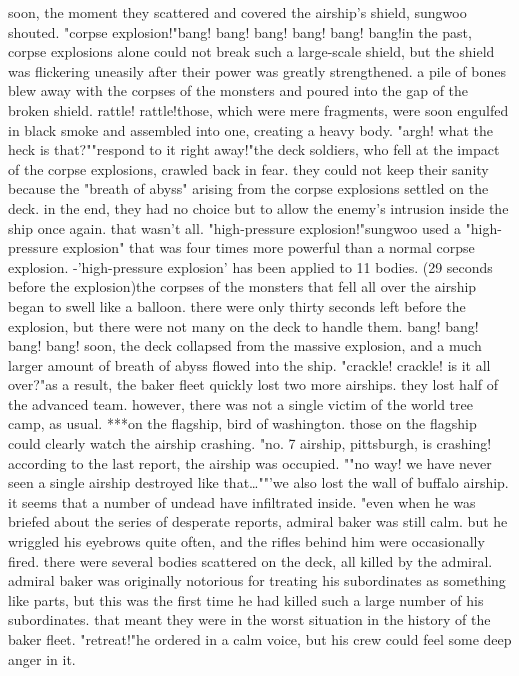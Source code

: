 soon, the moment they scattered and covered the airship's shield, sungwoo shouted.
"corpse explosion!"bang! bang! bang! bang! bang! bang!in the past, corpse explosions alone could not break such a large-scale shield, but the shield was flickering uneasily after their power was greatly strengthened.
 a pile of bones blew away with the corpses of the monsters and poured into the gap of the broken shield.
rattle! rattle!those, which were mere fragments, were soon engulfed in black smoke and assembled into one, creating a heavy body.
"argh! what the heck is that?""respond to it right away!"the deck soldiers, who fell at the impact of the corpse explosions, crawled back in fear.
they could not keep their sanity because the "breath of abyss" arising from the corpse explosions settled on the deck.
 in the end, they had no choice but to allow the enemy's intrusion inside the ship once again.
that wasn't all.
"high-pressure explosion!"sungwoo used a "high-pressure explosion" that was four times more powerful than a normal corpse explosion.
-'high-pressure explosion' has been applied to 11 bodies.
 (29 seconds before the explosion)the corpses of the monsters that fell all over the airship began to swell like a balloon.
there were only thirty seconds left before the explosion, but there were not many on the deck to handle them.
bang! bang! bang! bang!
soon, the deck collapsed from the massive explosion, and a much larger amount of breath of abyss flowed into the ship.
"crackle! crackle! is it all over?"as a result, the baker fleet quickly lost two more airships.
 they lost half of the advanced team.
however, there was not a single victim of the world tree camp, as usual.
***on the flagship, bird of washington.
those on the flagship could clearly watch the airship crashing.
"no.
7 airship, pittsburgh, is crashing! according to the last report, the airship was occupied.
""no way! we have never seen a single airship destroyed like that…""'we also lost the wall of buffalo airship.
 it seems that a number of undead have infiltrated inside.
"even when he was briefed about the series of desperate reports, admiral baker was still calm.
but he wriggled his eyebrows quite often, and the rifles behind him were occasionally fired.
there were several bodies scattered on the deck, all killed by the admiral.
 admiral baker was originally notorious for treating his subordinates as something like parts, but this was the first time he had killed such a large number of his subordinates.
 that meant they were in the worst situation in the history of the baker fleet.
"retreat!"he ordered in a calm voice, but his crew could feel some deep anger in it.
